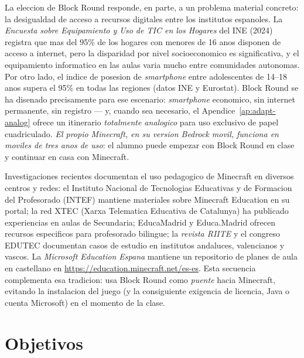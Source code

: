 \documentclass[12pt,a4paper]{scrartcl}
\begin{document}
\begin{nota}
La eleccion de Block Round responde, en parte, a un problema material concreto: la desigualdad de acceso a recursos digitales entre los institutos espanoles. La \emph{Encuesta sobre Equipamiento y Uso de TIC en los Hogares} del INE (2024) registra que mas del 95\% de los hogares con menores de 16 anos disponen de acceso a internet, pero la disparidad por nivel socioeconomico es significativa, y el equipamiento informatico en las aulas varia mucho entre comunidades autonomas. Por otro lado, el indice de posesion de \emph{smartphone} entre adolescentes de 14--18 anos supera el 95\% en todas las regiones (datos INE y Eurostat). Block Round se ha disenado precisamente para ese escenario: \emph{smartphone} economico, sin internet permanente, sin registro --- y, cuando sea necesario, el Apendice~\ref{ap:adapt-analog} ofrece un itinerario \emph{totalmente analogico} para uso exclusivo de papel cuadriculado. \emph{El propio Minecraft, en su version Bedrock movil, funciona en moviles de tres anos de uso}: el alumno puede empezar con Block Round en clase y continuar en casa con Minecraft.
\end{nota}

\begin{minecraft}
Investigaciones recientes documentan el uso pedagogico de Minecraft en diversos centros y redes: el Instituto Nacional de Tecnologias Educativas y de Formacion del Profesorado (INTEF) mantiene materiales sobre Minecraft Education en su portal; la red XTEC (Xarxa Telematica Educativa de Catalunya) ha publicado experiencias en aulas de Secundaria; EducaMadrid y Educa.Madrid ofrecen recursos especificos para profesorado bilingue; la \emph{revista RIITE} y el congreso EDUTEC documentan casos de estudio en institutos andaluces, valencianos y vascos. La \emph{Microsoft Education Espana} mantiene un repositorio de planes de aula en castellano en \url{https://education.minecraft.net/es-es}. Esta secuencia complementa esa tradicion: usa Block Round como \emph{puente} hacia Minecraft, evitando la instalacion del juego (y la consiguiente exigencia de licencia, Java o cuenta Microsoft) en el momento de la clase.
\end{minecraft}

\section{Objetivos}\label{sec:objetivos}
\end{document}
